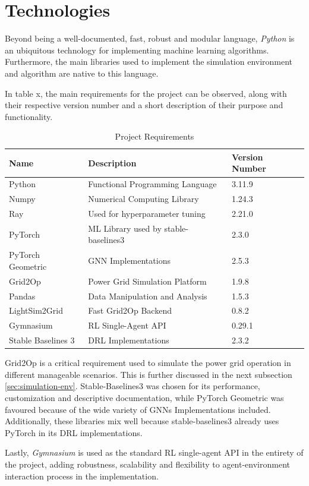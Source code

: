 \section{Technologies}

Beyond being a well-documented, fast, robust and modular language, \textit{Python} is an ubiquitous technology for implementing machine learning algorithms. Furthermore, the main libraries used to implement the simulation environment and algorithm are native to this language.
\par
In table x, the main requirements for the project can be observed, along with their respective version number and a short description of their purpose and functionality.
\par

\begin{table}
	\begin{tabular}{|l|l|l|}
		\hline
		\textbf{Name} & \textbf{Description} & \textbf{Version Number} \\
		\hline
		Python & Functional Programming Language & 3.11.9 \\
		\hline
		Numpy & Numerical Computing Library& 1.24.3 \\
		\hline
		Ray & Used for hyperparameter tuning & 2.21.0 \\
		\hline
		PyTorch & \acs{ML} Library used by stable-baselines3 & 2.3.0 \\
		\hline
		PyTorch Geometric & \ac{GNN} Implementations & 2.5.3 \\
		\hline
		Grid2Op & Power Grid Simulation Platform & 1.9.8 \\
		\hline
		Pandas & Data Manipulation and Analysis & 1.5.3 \\
		\hline
		LightSim2Grid & Fast Grid2Op Backend & 0.8.2 \\
		\hline
		Gymnasium & \ac{RL} Single-Agent API & 0.29.1 \\
		\hline
		Stable Baselines 3 & \ac{DRL} Implementations & 2.3.2 \\
		\hline
	\end{tabular}
	\caption{Project Requirements}
\end{table}

Grid2Op is a critical requirement used to simulate the power grid operation in different manageable scenarios. This is further discussed in the next subsection \ref{sec:simulation-env}. Stable-Baselines3 was chosen for its performance, customization and descriptive documentation, while PyTorch Geometric was favoured because of the wide variety of \acp{GNN} Implementations included. Additionally, these libraries mix well because stable-baselines3 already uses PyTorch in its \ac{DRL} implementations.
\par
Lastly, \textit{Gymnasium} is used as the standard \ac{RL} single-agent API in the entirety of the project, adding robustness, scalability and flexibility to agent-environment interaction process in the implementation.  \par

